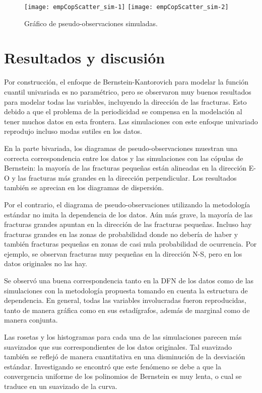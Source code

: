 \begin{figure}[H]
	\centering
	\texttt{[image: empCopScatter\_sim-1]}
	\texttt{[image: empCopScatter\_sim-2]}
	\caption{Gr\'afico de pseudo-observaciones simuladas.}
\end{figure}


\section{Resultados y discusi\'on}
\label{sec:results}

Por construcci\'on, el enfoque de Bernstein-Kantorovich para modelar la funci\'on cuantil univariada es no param\'etrico, pero se observaron muy buenos resultados para modelar todas las variables, incluyendo la direcci\'on de las fracturas.
Esto debido a que el problema de la periodicidad se compensa en la modelaci\'on al tener muchos datos en esta frontera.
Las simulaciones con este enfoque univariado reprodujo incluso modas sutiles en los datos.

En la parte bivariada, los diagramas de pseudo-observaciones muestran una correcta correspondencia entre los datos y las simulaciones con las c\'opulas de Bernstein: la mayor\'ia de las fracturas peque\~nas est\'an alineadas en la direcci\'on E-O y las fracturas m\'as grandes en la direcci\'on perpendicular. Los resultados tambi\'en se aprecian en los diagramas de dispersi\'on.

Por el contrario, el diagrama de pseudo-observaciones utilizando la metodolog\'ia est\'andar no imita la dependencia de los datos. A\'un m\'as grave, la mayor\'ia de las fracturas grandes apuntan en la direcci\'on de las fracturas peque\~nas. Incluso hay fracturas grandes en las zonas de probabilidad donde no deber\'ia de haber y tambi\'en fracturas peque\~nas en zonas de casi nula probabilidad de ocurrencia. Por ejemplo, se observan fracturas muy peque\~nas en la direcci\'on N-S, pero en los datos originales no las hay.

Se observ\'o una buena correspondencia tanto en la DFN de los datos como de las simulaciones con la metodolog\'ia propuesta tomando en cuenta la estructura de dependencia. En general, todas las variables involucradas fueron reproducidas, tanto de manera gr\'afica como en sus estad\'igrafos, adem\'as de marginal como de manera conjunta.

Las rosetas y los histogramas para cada una de las simulaciones parecen m\'as suavizados que sus correspondientes de los datos originales. Tal suavizado tambi\'en se reflej\'o de manera cuantitativa en una disminuci\'on de la desviaci\'on est\'andar. Investigando se encontr\'o \citep[p. 251]{phillips_interpolation_2003} que este fen\'omeno se debe a que la convergencia uniforme de los polinomios de Bernstein es muy lenta, o cual se traduce en un suavizado de la curva.

